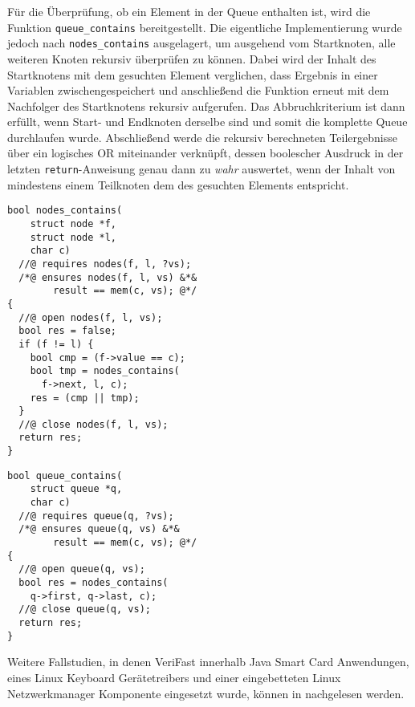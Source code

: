 \noindent
Für die Überprüfung, ob ein Element in der Queue enthalten ist, wird die Funktion \texttt{queue\_contains} bereitgestellt. Die eigentliche Implementierung wurde jedoch nach \texttt{nodes\_contains} ausgelagert, um ausgehend vom Startknoten, alle weiteren Knoten rekursiv überprüfen zu können. Dabei wird der Inhalt des Startknotens mit dem gesuchten Element verglichen, dass Ergebnis in einer Variablen zwischengespeichert und anschließend die Funktion erneut mit dem Nachfolger des Startknotens rekursiv aufgerufen. Das Abbruchkriterium ist dann erfüllt, wenn Start- und Endknoten derselbe sind und somit die komplette Queue durchlaufen wurde. Abschließend werde die rekursiv berechneten Teilergebnisse über ein logisches OR miteinander verknüpft, dessen boolescher Ausdruck in der letzten \texttt{return}-Anweisung genau dann zu \emph{wahr} auswertet, wenn der Inhalt von mindestens einem Teilknoten dem des gesuchten Elements entspricht.

\vspace{-10pt}
{\noindent
\begin{minipage}[t]{.45\textwidth}
\begin{lstlisting}
bool nodes_contains(
    struct node *f,
    struct node *l,
    char c)
  //@ requires nodes(f, l, ?vs);
  /*@ ensures nodes(f, l, vs) &*&
        result == mem(c, vs); @*/
{
  //@ open nodes(f, l, vs);
  bool res = false;
  if (f != l) {
    bool cmp = (f->value == c);
    bool tmp = nodes_contains(
      f->next, l, c);
    res = (cmp || tmp);
  }
  //@ close nodes(f, l, vs);
  return res;
}
\end{lstlisting}
\end{minipage}
\hfill
\begin{minipage}[t]{.45\textwidth}
\begin{lstlisting}
bool queue_contains(
    struct queue *q,
    char c)
  //@ requires queue(q, ?vs);
  /*@ ensures queue(q, vs) &*&
        result == mem(c, vs); @*/
{
  //@ open queue(q, vs);
  bool res = nodes_contains(
    q->first, q->last, c);
  //@ close queue(q, vs);
  return res;
}
\end{lstlisting}
\end{minipage}
}

\noindent
Weitere Fallstudien, in denen VeriFast innerhalb Java Smart Card Anwendungen, eines Linux Keyboard Gerätetreibers und einer eingebetteten Linux Netzwerkmanager Komponente eingesetzt wurde, können in \cite{Philippaerts2013} nachgelesen werden.




